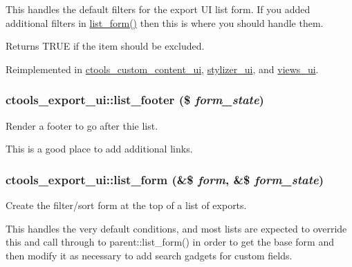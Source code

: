 This handles the default filters for the export UI list form. If you added additional filters in \hyperlink{classctools__export__ui_a238e12ec5bfd7325bebad4f6261b6fa5}{list\_\-form()} then this is where you should handle them.

\begin{DoxyReturn}{Returns}
TRUE if the item should be excluded. 
\end{DoxyReturn}


Reimplemented in \hyperlink{classctools__custom__content__ui_a3b389db39e1d13eb7beca1c35e8edf16}{ctools\_\-custom\_\-content\_\-ui}, \hyperlink{classstylizer__ui_aa964e50e906437af99898cbc222a3b22}{stylizer\_\-ui}, and \hyperlink{classviews__ui_a1b35936c70aff9359beb8d515af9e8ec}{views\_\-ui}.\hypertarget{classctools__export__ui_a80ba17871c5fd3bbb886ee58f330ae55}{
\subsubsection[{list\_\-footer}]{\setlength{\rightskip}{0pt plus 5cm}ctools\_\-export\_\-ui::list\_\-footer (\$ {\em form\_\-state})}}
\label{classctools__export__ui_a80ba17871c5fd3bbb886ee58f330ae55}
Render a footer to go after thie list.

This is a good place to add additional links. \hypertarget{classctools__export__ui_a238e12ec5bfd7325bebad4f6261b6fa5}{
\subsubsection[{list\_\-form}]{\setlength{\rightskip}{0pt plus 5cm}ctools\_\-export\_\-ui::list\_\-form (\&\$ {\em form}, \/  \&\$ {\em form\_\-state})}}
\label{classctools__export__ui_a238e12ec5bfd7325bebad4f6261b6fa5}
Create the filter/sort form at the top of a list of exports.

This handles the very default conditions, and most lists are expected to override this and call through to parent::list\_\-form() in order to get the base form and then modify it as necessary to add search gadgets for custom fields. 

